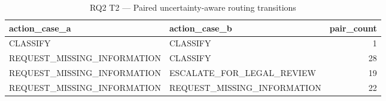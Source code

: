 \begin{table}
\caption{RQ2 T2 — Paired uncertainty-aware routing transitions}
\label{tab:rq2_t2_pair_transition_matrix}
\begin{tabular}{llr}
\toprule
action\_case\_a & action\_case\_b & pair\_count \\
\midrule
CLASSIFY & CLASSIFY & 1 \\
REQUEST\_MISSING\_INFORMATION & CLASSIFY & 28 \\
REQUEST\_MISSING\_INFORMATION & ESCALATE\_FOR\_LEGAL\_REVIEW & 19 \\
REQUEST\_MISSING\_INFORMATION & REQUEST\_MISSING\_INFORMATION & 22 \\
\bottomrule
\end{tabular}
\end{table}
